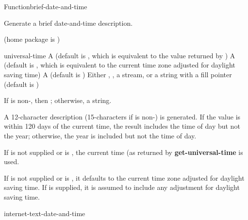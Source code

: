 \documentclass[10pt,twoside,english,pdftex]{article}
\begin{document}
\begin{functiondoc}{Function}{brief-date-and-time}{%
     
    \returns{} }
% 
% 

\fnsyntax

\fnpurpose Generate a brief date-and-time description.

\fnpackage {} (home package is )

\fnmodule {}

\fnargs
\begin{args}{universal-time}
 A  (default is \nil,
  which is equivalent to the value returned by
  )
 A  (default is \nil,
  which is equivalent to the current time zone adjusted for daylight
  saving time)
 A  (default is \nil)
\arg[destination] Either \nil, , a stream, or a string with a fill 
pointer (default is \nil)
\end{args}

\fnreturns If  is non-\nil, then \nil; otherwise, a string.

\fndescription 
A 12-character description (15-characters if  is non-\nil{}) is generated.  If the  value is within 120 days
of the current time, the result  includes the time of
day but not the year; otherwise, the year is included but not the time
of day.

\W{}
%
If  is not supplied or is \nil, the current time
(as returned by \textbf{get-universal-time} is used.  

\W{}
If  is not supplied or is \nil, it defaults to the
current time zone adjusted for daylight saving time. If
 is supplied, it is assumed to include any adjustment
for daylight saving time.

\begin{alsos}{internet-text-date-and-time}
\end{alsos}


\end{functiondoc}
\end{document}
